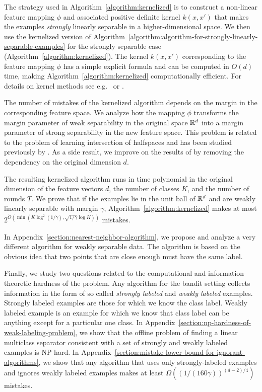 The strategy used in Algorithm~\ref{algorithm:kernelized} is to construct a
non-linear feature mapping $\phi$ and associated positive definite kernel
$k(x,x')$ that makes the examples \emph{strongly} linearly separable in a
higher-dimensional space. We then use the kernelized version of
Algorithm~\ref{algorithm:algorithm-for-strongly-linearly-separable-examples} for
the strongly separable case (Algorithm~\ref{algorithm:kernelized}). The kernel
$k(x,x')$ corresponding to the feature mapping $\phi$ has a simple explicit
formula and can be computed in $O(d)$ time, making
Algorithm~\ref{algorithm:kernelized} computationally efficient. For details on
kernel methods see e.g.~\citet{Scholkopf-Smola-2002} or
\citet{Shawe-Taylor-Cristianini-2004}.

The number of mistakes of the kernelized algorithm depends on the margin in the
corresponding feature space. We analyze how the mapping $\phi$ transforms the
margin parameter of weak separability in the original space $\mathbb{R}^d$ into a margin
parameter of strong separability in the new feature space. This problem is
related to the problem of learning intersection of halfspaces and has been
studied previously by \citet{Klivans-Servedio-2008}. As a side result, we
improve on the results of \citet{Klivans-Servedio-2008} by removing the
dependency on the original dimension $d$.

The resulting kernelized algorithm runs in time polynomial in the
original dimension of the feature vectors $d$, the number of classes $K$, and
the number of rounds $T$. We prove that if the examples lie in the unit ball of
$\mathbb{R}^d$ and are weakly linearly separable with margin $\gamma$,
Algorithm~\ref{algorithm:kernelized} makes at
most $2^{\widetilde{O}(\min(K \log^2 (1/\gamma), \sqrt{1/\gamma}
\log K))}$ mistakes.

In Appendix~\ref{section:nearest-neighbor-algorithm}, we propose and analyze a
very different algorithm for weakly separable data. The algorithm is based on
the obvious idea that two points that are close enough must have the same label.

Finally, we study two questions related to the computational and
information-theoretic hardness of the problem. Any algorithm for the bandit
setting collects information in the form of so called \emph{strongly labeled}
and \emph{weakly labeled} examples. Strongly labeled examples are those for
which we know the class label. Weakly labeled example is an example for which we
know that class label can be anything except for a particular one class.
In Appendix~\ref{section:np-hardness-of-weak-labeling-problem}, we show that the offline
problem of finding a linear multiclass separator consistent with a set of
strongly and weakly labeled examples is NP-hard. In
Appendix~\ref{section:mistake-lower-bound-for-ignorant-algorithms}, we show that
any algorithm that uses only strongly-labeled examples and ignores weakly
labeled examples makes at least $\Omega\left( \left(1/(160 \gamma)\right)^{(d-2)/4} \right)$
mistakes.
